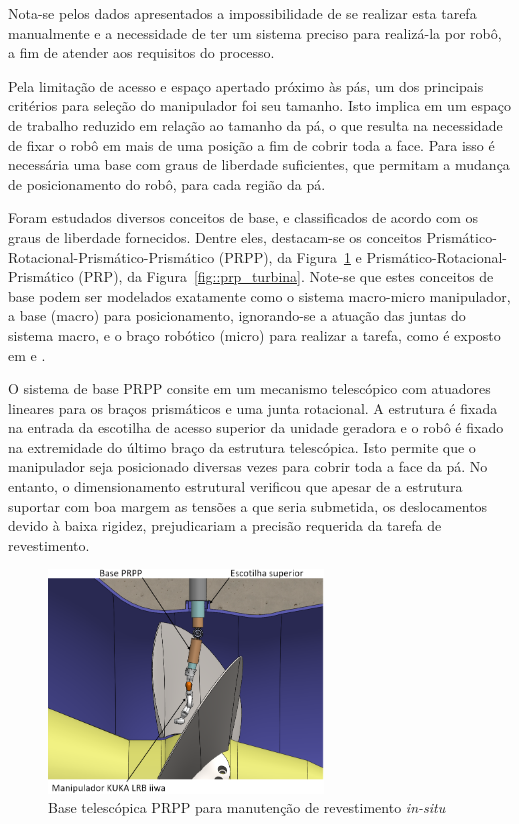 Nota-se pelos dados apresentados a impossibilidade de se realizar esta tarefa
manualmente e a necessidade de ter um sistema preciso para realizá-la por robô,
a fim de atender aos requisitos do processo.

Pela limitação de acesso e espaço apertado próximo às pás, um dos principais
critérios para seleção do manipulador foi seu tamanho. Isto implica em um
espaço de trabalho reduzido em relação ao tamanho da pá, o que resulta na
necessidade de fixar o robô em mais de uma posição a fim de cobrir
toda a face. Para isso é necessária uma base com graus de liberdade suficientes,
que permitam a mudança de posicionamento do robô, para cada região da pá. 

Foram estudados diversos conceitos de base, e classificados de acordo com os
graus de liberdade fornecidos. Dentre eles, destacam-se os conceitos
Prismático-Rotacional-Prismático-Prismático (PRPP), da
Figura~\ref{fig::base_telesc_turbina} e Prismático-Rotacional-Prismático (PRP),
da Figura~\ref{fig::prp_turbina}. Note-se que estes conceitos de base podem ser
modelados exatamente como o sistema macro-micro manipulador, a base (macro) para
posicionamento, ignorando-se a atuação das juntas do sistema macro, e o braço
robótico (micro) para realizar a tarefa, como é exposto em
\cite{sharon1993macro} e \cite{lew1994bracing}.

O sistema de base PRPP consite em um mecanismo telescópico com atuadores
lineares para os braços prismáticos e uma junta rotacional. A estrutura é fixada
na entrada da escotilha de acesso superior da unidade geradora e o robô é fixado
na extremidade do último braço da estrutura telescópica. Isto permite que o
manipulador seja posicionado diversas vezes para cobrir toda a face da pá. No
entanto, o dimensionamento estrutural verificou que apesar de a estrutura
suportar com boa margem as tensões a que seria submetida, os deslocamentos
devido à baixa rigidez, prejudicariam a precisão requerida da tarefa de
revestimento.

\begin{figure}[t]
	\centering 
 	\includegraphics[width=0.65\textwidth]{figs/base_telesc_turbina}
 	\caption{Base telescópica PRPP para manutenção de revestimento
 	\textit{in-situ}}
 	\label{fig::base_telesc_turbina}
\end{figure}

